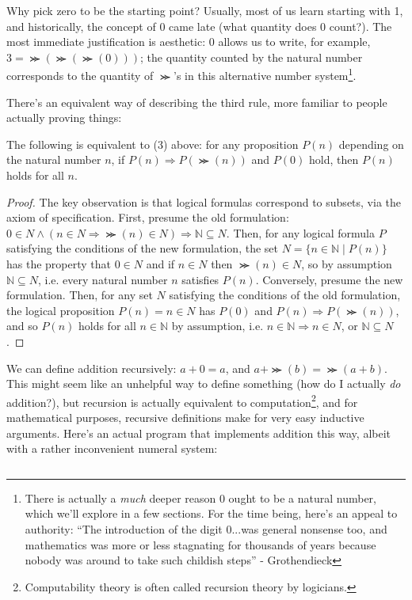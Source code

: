 Why pick zero to be the starting point?
Usually, most of us learn starting with 1, and historically, the concept of 0 came late (what quantity does 0 count?).
The most immediate justification is aesthetic: 0 allows us to write, for example, $3 = \Succ(\Succ(\Succ(0)))$;
the quantity counted by the natural number corresponds to the quantity of $\Succ$'s in this alternative number system\footnote
{
  There is actually a \textit{much} deeper reason 0 ought to be a natural number, which we'll explore in a few sections.
  For the time being, here's an appeal to authority: ``The introduction of the digit 0...was general nonsense too,
  and mathematics was more or less stagnating for thousands of years because nobody was around to take such childish steps'' - Grothendieck
}.

There's an equivalent way of describing the third rule, more familiar to people actually proving things:
\begin{thm}
  The following is equivalent to (3) above: for any proposition $P(n)$ depending on the natural number $n$, if $P(n) \Rightarrow P(\Succ(n))$
  and $P(0)$ hold, then $P(n)$ holds for all $n$.
\end{thm}

\begin{proof}
  The key observation is that logical formulas correspond to subsets, via the axiom of specification.
  First, presume the old formulation: $0 \in N \land (n \in N \Rightarrow \Succ(n) \in N) \Rightarrow \mathbb{N} \subseteq N$.
  Then, for any logical formula $P$ satisfying the conditions of the new formulation, the set $N = \{n \in \mathbb{N} \mid P(n)\}$
  has the property that $0 \in N$ and if $n \in N$ then $\Succ(n) \in N$, so by assumption $\mathbb{N} \subseteq N$,
  i.e. every natural number $n$ satisfies $P(n)$.
  Conversely, presume the new formulation.
  Then, for any set $N$ satisfying the conditions of the old formulation, the logical proposition $P(n) = n \in N$ has $P(0)$
  and $P(n) \Rightarrow P(\Succ(n))$, and so $P(n)$ holds for all $n \in \mathbb{N}$ by assumption, i.e. $n \in \mathbb{N} \Rightarrow n \in N$,
  or $\mathbb{N} \subseteq N$.
\end{proof}

We can define addition recursively: $a + 0 = a$, and $a + \Succ(b) = \Succ(a + b)$.
This might seem like an unhelpful way to define something (how do I actually \textit{do} addition?),
but recursion is actually equivalent to computation\footnote
{
  Computability theory is often called recursion theory by logicians.
},
and for mathematical purposes, recursive definitions make for very easy inductive arguments.
Here's an actual program that implements addition this way, albeit with a rather inconvenient numeral system:
\inputminted{scheme}{chap1/addition.scm}

